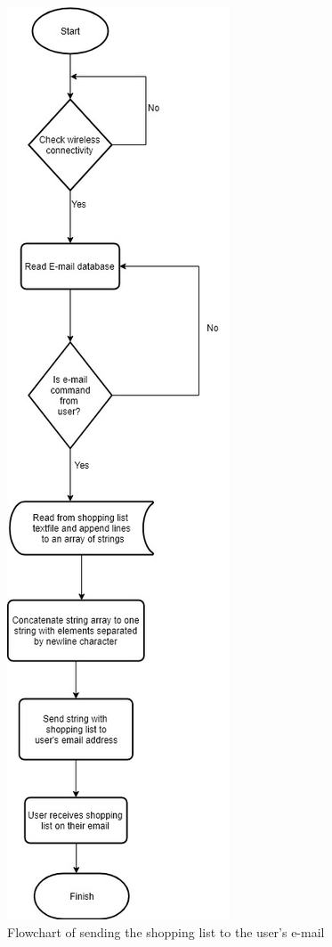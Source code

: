 \begin{figure}[h]
	\centering
	\includegraphics[scale=0.5]{36.jpg}
	\caption{Flowchart of sending the shopping list to the user's e-mail}
\end{figure}
\clearpage
